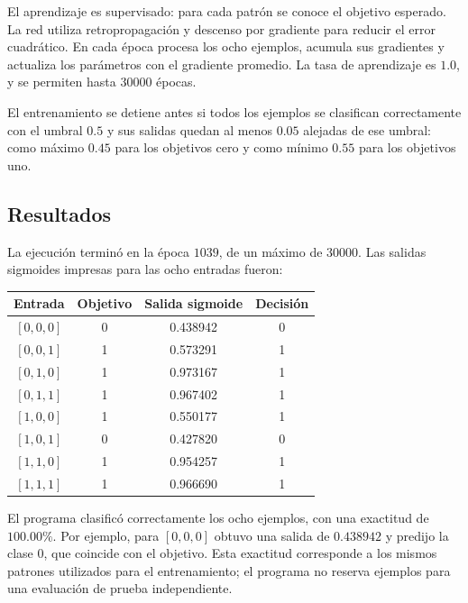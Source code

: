 \documentclass[12pt,a4paper]{article}
\begin{document}
El aprendizaje es supervisado: para cada patrón se conoce el objetivo esperado. La red utiliza retropropagación y descenso por gradiente para reducir el error cuadrático. En cada época procesa los ocho ejemplos, acumula sus gradientes y actualiza los parámetros con el gradiente promedio. La tasa de aprendizaje es \(1.0\), y se permiten hasta \(30000\) épocas.

El entrenamiento se detiene antes si todos los ejemplos se clasifican correctamente con el umbral \(0.5\) y sus salidas quedan al menos \(0.05\) alejadas de ese umbral: como máximo \(0.45\) para los objetivos cero y como mínimo \(0.55\) para los objetivos uno.

\subsection{Resultados}

La ejecución terminó en la época \(1039\), de un máximo de \(30000\). Las salidas sigmoides impresas para las ocho entradas fueron:
\begin{center}
\begin{tabular}{cccc}
\hline
Entrada & Objetivo & Salida sigmoide & Decisión \\
\hline
\([0,0,0]\) & 0 & 0.438942 & 0 \\
\([0,0,1]\) & 1 & 0.573291 & 1 \\
\([0,1,0]\) & 1 & 0.973167 & 1 \\
\([0,1,1]\) & 1 & 0.967402 & 1 \\
\([1,0,0]\) & 1 & 0.550177 & 1 \\
\([1,0,1]\) & 0 & 0.427820 & 0 \\
\([1,1,0]\) & 1 & 0.954257 & 1 \\
\([1,1,1]\) & 1 & 0.966690 & 1 \\
\hline
\end{tabular}
\end{center}
El programa clasificó correctamente los ocho ejemplos, con una exactitud de \(100.00\%\). Por ejemplo, para \([0,0,0]\) obtuvo una salida de \(0.438942\) y predijo la clase \(0\), que coincide con el objetivo. Esta exactitud corresponde a los mismos patrones utilizados para el entrenamiento; el programa no reserva ejemplos para una evaluación de prueba independiente.
\end{document}
